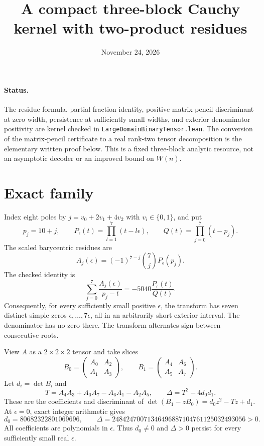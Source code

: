 \documentclass[11pt]{article}
\begin{document}
\title{A compact three-block Cauchy kernel with two-product residues}
\date{November 24, 2026}
\maketitle

\paragraph{Status.}
The residue formula, partial-fraction identity, positive matrix-pencil
discriminant at zero width, persistence at sufficiently small widths,
and exterior denominator positivity are kernel checked in
\texttt{LargeDomainBinaryTensor.lean}. The conversion of the matrix-pencil
certificate to a real rank-two tensor decomposition is the elementary
written proof below. This is a fixed three-block analytic resource, not an
asymptotic decoder or an improved bound on $W(n)$.

\section{Exact family}
Index eight poles by $j=v_0+2v_1+4v_2$ with $v_i\in\{0,1\}$, and put
\[
 p_j=10+j,\qquad P_\epsilon(t)=\prod_{l=1}^7(t-l\epsilon),
 \qquad Q(t)=\prod_{j=0}^7(t-p_j).
\]
The scaled barycentric residues are
\[
 A_j(\epsilon)=(-1)^{7-j}\binom7j P_\epsilon(p_j).
\]
The checked identity is
\[
 \sum_{j=0}^7\frac{A_j(\epsilon)}{p_j-t}
 =-5040\frac{P_\epsilon(t)}{Q(t)}.
\]
Consequently, for every sufficiently small positive $\epsilon$, the
transform has seven distinct simple zeros $\epsilon,\ldots,7\epsilon$,
all in an arbitrarily short exterior interval. The denominator has no
zero there. The transform alternates sign between consecutive roots.

View $A$ as a $2\times2\times2$ tensor and take slices
\[
 B_0=\begin{pmatrix}A_0&A_2\\A_1&A_3\end{pmatrix},\qquad
 B_1=\begin{pmatrix}A_4&A_6\\A_5&A_7\end{pmatrix}.
\]
Let $d_i=\det B_i$ and
\[
 T=A_4A_3+A_0A_7-A_6A_1-A_2A_5,
 \qquad \Delta=T^2-4d_0d_1.
\]
These are the coefficients and discriminant of
$\det(B_1-zB_0)=d_0z^2-Tz+d_1$. At $\epsilon=0$, exact integer arithmetic gives
\[
 d_0=80682322801069696,\qquad
 \Delta=24842470071346496887104761125032493056>0.
\]
All coefficients are polynomials in $\epsilon$. Thus $d_0\ne0$ and
$\Delta>0$ persist for every sufficiently small real $\epsilon$.
\end{document}

